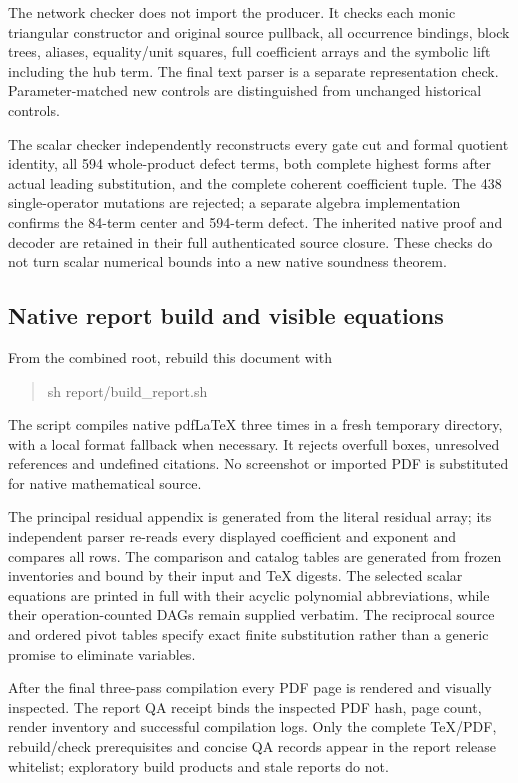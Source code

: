 The network checker does not import the producer. It checks each monic
triangular constructor and original source pullback, all occurrence bindings,
block trees, aliases, equality/unit squares, full coefficient arrays and the
symbolic lift including the hub term. The final text parser is a separate
representation check. Parameter-matched new controls are distinguished from
unchanged historical controls.

The scalar checker independently reconstructs every gate cut and formal
quotient identity, all 594 whole-product defect terms, both complete highest
forms after actual leading substitution, and the complete coherent coefficient
tuple. The 438 single-operator mutations are rejected; a separate algebra
implementation confirms the 84-term center and 594-term defect. The inherited
native proof and decoder are retained in their full authenticated source
closure. These checks do not turn scalar numerical bounds into a new native
soundness theorem.

\subsection{Native report build and visible equations}
From the combined root, rebuild this document with
\begin{quote}\ttfamily
sh report/build\_report.sh
\end{quote}
The script compiles native pdfLaTeX three times in a fresh temporary directory,
with a local format fallback when necessary. It rejects overfull boxes,
unresolved references and undefined citations. No screenshot or imported
PDF is substituted for native mathematical source.

The principal residual appendix is generated from the literal residual array;
its independent parser re-reads every displayed coefficient and exponent and
compares all rows. The comparison and catalog tables are generated from
frozen inventories and bound by their input and TeX digests. The selected
scalar equations are printed in full with their acyclic polynomial
abbreviations, while their operation-counted DAGs remain supplied verbatim.
The reciprocal source and ordered pivot tables specify exact finite
substitution rather than a generic promise to eliminate variables.

After the final three-pass compilation every PDF page is rendered and visually
inspected. The report QA receipt binds the inspected PDF hash, page count,
render inventory and successful compilation logs. Only the complete TeX/PDF,
rebuild/check prerequisites and concise QA records appear in the report
release whitelist; exploratory build products and stale reports do not.

